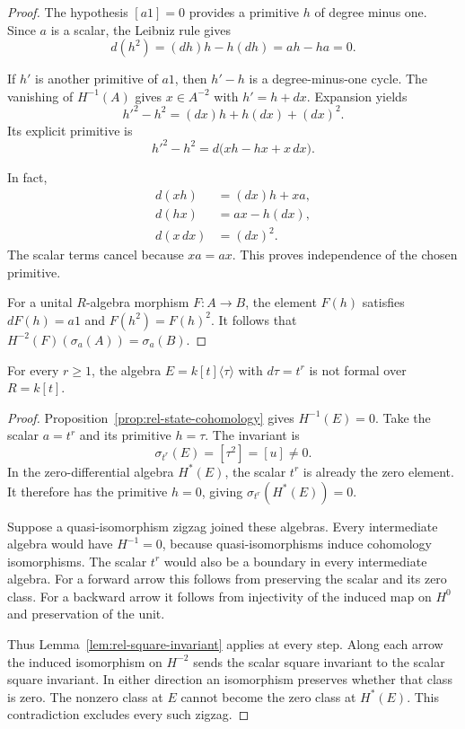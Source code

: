 \begin{proof}
The hypothesis $[a1]=0$ provides a primitive $h$ of degree minus one.
Since $a$ is a scalar, the Leibniz rule gives
\[
 d(h^2)=(dh)h-h(dh)=ah-ha=0.
\]

If $h'$ is another primitive of $a1$, then $h'-h$ is a degree-minus-one cycle.
The vanishing of $H^{-1}(A)$ gives $x\in A^{-2}$ with $h'=h+dx$.
Expansion yields
\[
 h'^2-h^2=(dx)h+h(dx)+(dx)^2.
\]
Its explicit primitive is
\begin{equation}\label{eq:rel-square-independence}
 h'^2-h^2=d\bigl(xh-hx+x\,dx\bigr).
\end{equation}

In fact,
\[
 \begin{split}
 d(xh)&=(dx)h+xa,\\
 d(hx)&=ax-h(dx),\\
 d(x\,dx)&=(dx)^2.
 \end{split}
\]
The scalar terms cancel because $xa=ax$.
This proves independence of the chosen primitive.

For a unital $R$-algebra morphism $F:A\to B$, the element $F(h)$
satisfies $dF(h)=a1$ and $F(h^2)=F(h)^2$.
It follows that $H^{-2}(F)(\sigma_a(A))=\sigma_a(B)$.
\end{proof}

\begin{theorem}\label{thm:rel-nonformality}
For every $r\geq1$, the algebra
$E=k[t]\langle\tau\rangle$ with $d\tau=t^r$ is not formal over $R=k[t]$.
\end{theorem}

\begin{proof}
Proposition~\ref{prop:rel-state-cohomology} gives $H^{-1}(E)=0$.
Take the scalar $a=t^r$ and its primitive $h=\tau$.
The invariant is
\[
 \sigma_{t^r}(E)=[\tau^2]=[u]\ne0.
\]
In the zero-differential algebra $H^*(E)$, the scalar $t^r$ is already
the zero element. It therefore has the primitive $h=0$, giving
$\sigma_{t^r}(H^*(E))=0$.

Suppose a quasi-isomorphism zigzag joined these algebras.
Every intermediate algebra would have $H^{-1}=0$, because
quasi-isomorphisms induce cohomology isomorphisms.
The scalar $t^r$ would also be a boundary in every intermediate algebra.
For a forward arrow this follows from preserving the scalar and its zero
class. For a backward arrow it follows from injectivity of the induced
map on $H^0$ and preservation of the unit.

Thus Lemma~\ref{lem:rel-square-invariant} applies at every step.
Along each arrow the induced isomorphism on $H^{-2}$ sends the scalar
square invariant to the scalar square invariant.
In either direction an isomorphism preserves whether that class is zero.
The nonzero class at $E$ cannot become the zero class at $H^*(E)$.
This contradiction excludes every such zigzag.
\end{proof}

